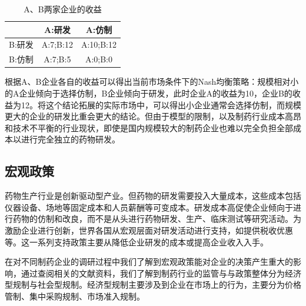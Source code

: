 \documentclass[twocolumn]{ctexbook}
\begin{document}
			
			\begin{table}
				\centering
				\begin{tabular}{|c|c|c|}
					\hline
					\quad  & A:研发   & A:仿制    \\
					\hline
					B:研发 & A:7;B:12 & A:10;B:12 \\
					\hline
					B:仿制 & A:7;B:5  & A:0;B:0   \\
					\hline
				\end{tabular}
				\caption{A、B两家企业的收益}
				\label{tab:tab2}
			\end{table}
			
			根据A、B企业各自的收益可以得出当前市场条件下的Nash均衡策略：规模相对小的A企业倾向于选择仿制，B企业倾向于研发，此时企业A的收益为10，企业B的收益为12。将这个结论拓展的实际市场中，可以得出小企业通常会选择仿制，而规模更大的企业的研发比重会更大的结论。但由于模型的限制，以及制药行业成本高昂和技术不平衡的行业现状，即使是国内规模较大的制药企业也难以完全负担全部成本以进行完全独立的药物研发。
			
			\subsection{宏观政策}
			
			药物生产行业是创新驱动型产业。但药物的研发需要投入大量成本，这些成本包括仪器设备、场地等固定成本和人员薪酬等可变成本。研发成本高促使企业倾向于进行药物的仿制和改良，而不是从头进行药物研发、生产、临床测试等研究活动。为激励企业进行创新，世界各国从宏观层面对研发活动进行支持，如提供税收优惠等。这一系列支持政策主要从降低企业研发的成本或提高企业收入入手。
			
			在对不同制药企业的调研过程中我们了解到宏观政策能对企业的决策产生重大的影响，通过查阅相关的文献资料，我们了解到制药行业的监管与与政策整体分为经济型规制与社会型规制\citep{RN26}。经济型规制主要涉及到企业在市场上的行为，主要分为价格管制、集中采购规制、市场准入规制。
			
\end{document}

